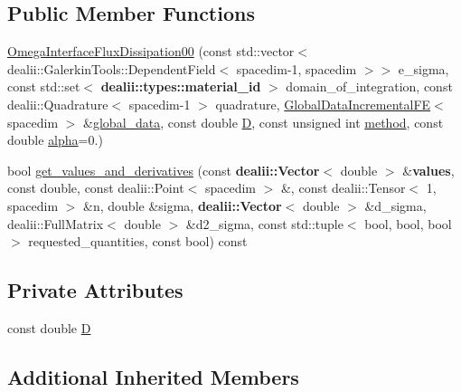 \subsection*{Public Member Functions}
\begin{DoxyCompactItemize}
\item 
\hyperlink{classincremental_f_e_1_1_omega_interface_flux_dissipation00_a57559567b075fc91c5d43d6d1da03b1e}{Omega\+Interface\+Flux\+Dissipation00} (const std\+::vector$<$ dealii\+::\+Galerkin\+Tools\+::\+Dependent\+Field$<$ spacedim-\/1, spacedim $>$$>$ e\+\_\+sigma, const std\+::set$<$ {\bf dealii\+::types\+::material\+\_\+id} $>$ domain\+\_\+of\+\_\+integration, const dealii\+::\+Quadrature$<$ spacedim-\/1 $>$ quadrature, \hyperlink{classincremental_f_e_1_1_global_data_incremental_f_e}{Global\+Data\+Incremental\+FE}$<$ spacedim $>$ \&\hyperlink{classincremental_f_e_1_1_omega_abd23d288a7a4a43f9b528be968cd2113}{global\+\_\+data}, const double \hyperlink{classincremental_f_e_1_1_omega_interface_flux_dissipation00_ab6efbe2a1c165f99e02c22e4df530d0b}{D}, const unsigned int \hyperlink{classincremental_f_e_1_1_omega_a7600d263ebf98129629e44fa67e8a58c}{method}, const double \hyperlink{classincremental_f_e_1_1_omega_a891688560ec0ad8dc5a0058a7b400269}{alpha}=0.)
\item 
bool \hyperlink{classincremental_f_e_1_1_omega_interface_flux_dissipation00_a1d609a41db2f3231ad2f2d05aeea5441}{get\+\_\+values\+\_\+and\+\_\+derivatives} (const {\bf dealii\+::\+Vector}$<$ double $>$ \&{\bf values}, const double, const dealii\+::\+Point$<$ spacedim $>$ \&, const dealii\+::\+Tensor$<$ 1, spacedim $>$ \&n, double \&sigma, {\bf dealii\+::\+Vector}$<$ double $>$ \&d\+\_\+sigma, dealii\+::\+Full\+Matrix$<$ double $>$ \&d2\+\_\+sigma, const std\+::tuple$<$ bool, bool, bool $>$ requested\+\_\+quantities, const bool) const 
\end{DoxyCompactItemize}
\subsection*{Private Attributes}
\begin{DoxyCompactItemize}
\item 
const double \hyperlink{classincremental_f_e_1_1_omega_interface_flux_dissipation00_ab6efbe2a1c165f99e02c22e4df530d0b}{D}
\end{DoxyCompactItemize}
\subsection*{Additional Inherited Members}


